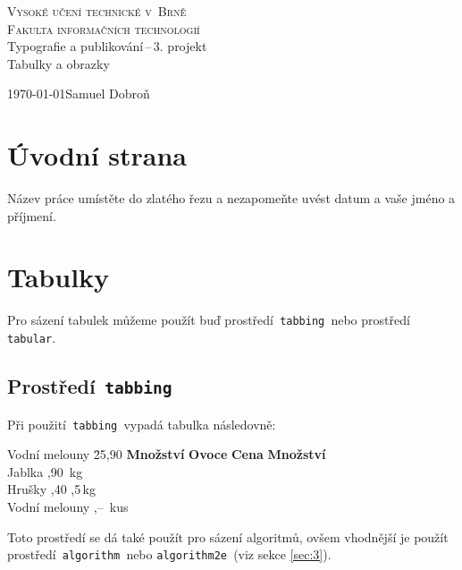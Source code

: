 \documentclass[11pt, a4paper]{article}
\begin{document}
	\begin{titlepage}
		\begin{center}
				\Huge{\textsc{Vysoké učení technické v~Brně}}\\
				\huge{\textsc{Fakulta informačních technologií}}
			\\
			\LARGE{Typografie a publikování\,--\,3. projekt}\\
			\Huge{Tabulky a obrazky}
		\end{center}
    	{\Large \today \hfill Samuel Dobroň}
	\end{titlepage}

\section{Úvodní strana}
	Název práce umístěte do zlatého řezu a nezapomeňte uvést  datum a vaše jméno a příjmení.

\section{Tabulky}
    Pro sázení tabulek můžeme použít buď prostředí\texttt{ tabbing }nebo prostředí\texttt{ tabular}.

\subsection{Prostředí\texttt{ tabbing}}
    Při použití\texttt{ tabbing }vypadá tabulka následovně: \begin{tabbing}
        Vodní melouny \quad \= 25,90 \quad \= \textbf{Množství} \kill %
        \textbf{Ovoce} \> \textbf{Cena} \> \textbf{Množství} \\
        Jablka  ,90   \,kg \\
        Hrušky  ,40   ,5\,kg\\
        Vodní melouny ,--  \,kus\\
    \end{tabbing}
    \noindent Toto prostředí se dá také použít pro sázení algoritmů, ovšem vhodnější je použít prostředí\texttt{ algorithm }nebo \texttt{algorithm2e }(viz sekce \ref{sec:3}).
\end{document}
